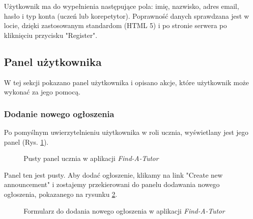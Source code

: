 \documentclass[12pt]{article}
\numberwithin{figure}{section}
\begin{document}
\begin{sloppypar}
Użytkownik ma do wypełnienia następujące pola: imię, nazwisko, adres email, hasło i typ konta (uczeń lub korepetytor). Poprawność danych sprawdzana jest w locie, dzięki zastosowanym standardom (HTML 5) i po stronie serwera po kliknięciu przycisku "Register".

\subsection{Panel użytkownika}
W tej sekcji pokazano panel użytkownika i opisano akcje, które użytkownik może wykonać za jego pomocą.

\subsubsection{Dodanie nowego ogłoszenia}
Po pomyślnym uwierzytelnieniu użytkownika w roli ucznia, wyświetlany jest jego panel (Rys. \ref{fig:student-empty}).

\begin{figure}[!htbp] 
    \centering
    \caption{Pusty panel ucznia w aplikacji \textit{Find-A-Tutor}}
    \label{fig:student-empty}
\end{figure}

Panel ten jest pusty. Aby dodać ogłoszenie, klikamy na link "Create new announcement" i zostajemy przekierowani do panelu dodawania nowego ogłoszenia, pokazanego na rysunku \ref{fig:create-new}.
\begin{figure}[!htbp] 
    \centering
    \caption{Formularz do dodania nowego ogłoszenia w aplikacji \textit{Find-A-Tutor}}
    \label{fig:create-new}
\end{figure}


\end{sloppypar}
\end{document}
